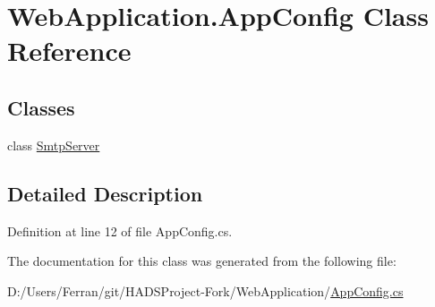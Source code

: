 \hypertarget{classWebApplication_1_1AppConfig}{}\section{Web\+Application.\+App\+Config Class Reference}
\label{classWebApplication_1_1AppConfig}
\subsection*{Classes}
\begin{DoxyCompactItemize}
\item 
class \mbox{\hyperlink{classWebApplication_1_1AppConfig_1_1SmtpServer}{Smtp\+Server}}
\end{DoxyCompactItemize}


\subsection{Detailed Description}


Definition at line 12 of file App\+Config.\+cs.



The documentation for this class was generated from the following file\+:\begin{DoxyCompactItemize}
\item 
D\+:/\+Users/\+Ferran/git/\+H\+A\+D\+S\+Project-\/\+Fork/\+Web\+Application/\mbox{\hyperlink{AppConfig_8cs}{App\+Config.\+cs}}\end{DoxyCompactItemize}
